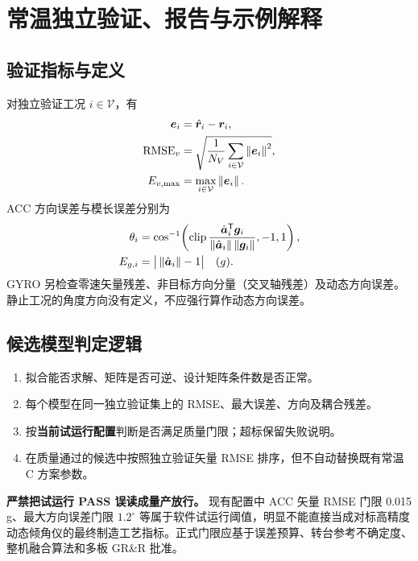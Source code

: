 \chapter{常温独立验证、报告与示例解释}
\section{验证指标与定义}
对独立验证工况 $i\in\mathcal V$，有
\begin{align}
\bm{e}_i&=\hat{\bm{r}}_i-\bm{r}_i,\\
\mathrm{RMSE}_{v}&=\sqrt{\frac1{N_V}\sum_{i\in\mathcal V}\left\lVert \bm{e}_i \right\rVert^2},\\
E_{v,\max}&=\max_{i\in\mathcal V}\left\lVert \bm{e}_i \right\rVert.
\end{align}
ACC 方向误差与模长误差分别为
\begin{align}
\theta_i&=\cos^{-1}\!\left(\operatorname{clip}\frac{\hat{\bm{a}}_i^\mathsf T\bm{g}_i}{\left\lVert \hat{\bm{a}}_i \right\rVert\left\lVert \bm{g}_i \right\rVert},-1,1\right),\\
E_{g,i}&=\big|\left\lVert \hat{\bm{a}}_i \right\rVert-1\big|\quad (g).
\end{align}
GYRO 另检查零速矢量残差、非目标方向分量（交叉轴残差）及动态方向误差。静止工况的角度方向没有定义，不应强行算作动态方向误差。

\section{候选模型判定逻辑}
\begin{enumerate}
\item 拟合能否求解、矩阵是否可逆、设计矩阵条件数是否正常。
\item 每个模型在同一独立验证集上的 RMSE、最大误差、方向及耦合残差。
\item 按\textbf{当前试运行配置}判断是否满足质量门限；超标保留失败说明。
\item 在质量通过的候选中按照独立验证矢量 RMSE 排序，但不自动替换既有常温 C 方案参数。
\end{enumerate}
\begin{warningbox}
\textbf{严禁把试运行 PASS 误读成量产放行。} 现有配置中 ACC 矢量 RMSE 门限 0.015 g、最大方向误差门限 $1.2^\circ$ 等属于软件试运行阈值，明显不能直接当成对标高精度动态倾角仪的最终制造工艺指标。正式门限应基于误差预算、转台参考不确定度、整机融合算法和多板 GR\&R 批准。
\end{warningbox}

